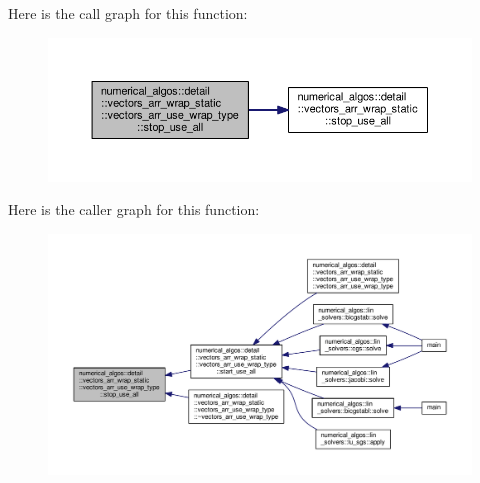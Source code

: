 Here is the call graph for this function\-:
\nopagebreak
\begin{figure}[H]
\begin{center}
\leavevmode
\includegraphics[width=350pt]{structnumerical__algos_1_1detail_1_1vectors__arr__wrap__static_1_1vectors__arr__use__wrap__type_adf139335704400b0a9ff32aa473ba64f_cgraph}
\end{center}
\end{figure}




Here is the caller graph for this function\-:
\nopagebreak
\begin{figure}[H]
\begin{center}
\leavevmode
\includegraphics[width=350pt]{structnumerical__algos_1_1detail_1_1vectors__arr__wrap__static_1_1vectors__arr__use__wrap__type_adf139335704400b0a9ff32aa473ba64f_icgraph}
\end{center}
\end{figure}




